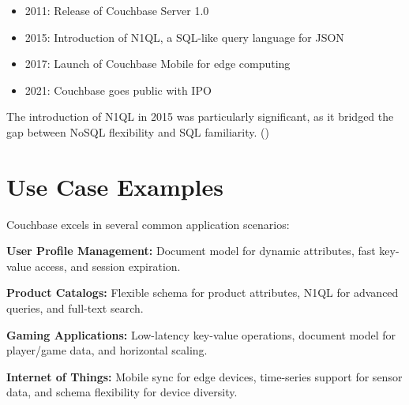 \begin{itemize}
  \item 2011: Release of Couchbase Server 1.0
  \item 2015: Introduction of N1QL, a SQL-like query language for JSON
  \item 2017: Launch of Couchbase Mobile for edge computing
  \item 2021: Couchbase goes public with IPO
\end{itemize}

The introduction of N1QL in 2015 was particularly significant, as it bridged the gap between NoSQL flexibility and SQL familiarity. (\cite{cbhistory})

\section{Use Case Examples}

Couchbase excels in several common application scenarios:

\textbf{User Profile Management:} Document model for dynamic attributes, fast key-value access, and session expiration.

\textbf{Product Catalogs:} Flexible schema for product attributes, N1QL for advanced queries, and full-text search.

\textbf{Gaming Applications:} Low-latency key-value operations, document model for player/game data, and horizontal scaling.

\textbf{Internet of Things:} Mobile sync for edge devices, time-series support for sensor data, and schema flexibility for device diversity.